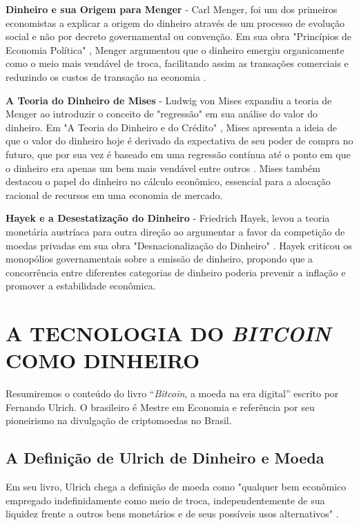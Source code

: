 \documentclass[article,12pt,oneside,a4paper,english,brazil]{unifil}
\begin{document}
\begin{Spacing}{1.5}
\textbf{Dinheiro e sua Origem para Menger} - Carl Menger, foi um dos primeiros economistas a explicar a origem do dinheiro através de um processo de evolução social e não por decreto governamental ou convenção. Em sua obra "Princípios de Economia Política" \cite{menger2017liberalismo}, Menger argumentou que o dinheiro emergiu organicamente como o meio mais vendável de troca, facilitando assim as transações comerciais e reduzindo os custos de transação na economia \cite{menger1871principles}.

\textbf{A Teoria do Dinheiro de Mises} - Ludwig von Mises expandiu a teoria de Menger ao introduzir o conceito de "regressão" em sua análise do valor do dinheiro. Em "A Teoria do Dinheiro e do Crédito" \cite{von2013theory}, Mises apresenta a ideia de que o valor do dinheiro hoje é derivado da expectativa de seu poder de compra no futuro, que por sua vez é baseado em uma regressão contínua até o ponto em que o dinheiro era apenas um bem mais vendável entre outros \cite{von2013theory}. Mises também destacou o papel do dinheiro no cálculo econômico, essencial para a alocação racional de recursos em uma economia de mercado.

\textbf{Hayek e a Desestatização do Dinheiro} - Friedrich Hayek, levou a teoria monetária austríaca para outra direção ao argumentar a favor da competição de moedas privadas em sua obra "Desnacionalização do Dinheiro" \cite{hayek2017desestatizaccao}. Hayek criticou os monopólios governamentais sobre a emissão de dinheiro, propondo que a concorrência entre diferentes categorias de dinheiro poderia prevenir a inflação e promover a estabilidade econômica.

\section*{A TECNOLOGIA DO \textit{BITCOIN} COMO DINHEIRO} \label{sec:dinheiro}
Resumiremos o conteúdo do livro ``\textit{Bitcoin}, a moeda na era digital'' escrito por Fernando Ulrich. O brasileiro é Mestre em Economia e referência por seu pioneirismo na divulgação de criptomoedas no Brasil.

\subsection*{A Definição de Ulrich de Dinheiro e Moeda}

Em seu livro, Ulrich chega a definição de moeda como "qualquer bem econômico empregado indefinidamente como meio de troca, independentemente de sua liquidez frente a outros bens monetários e de seus possíveis usos alternativos" \cite[P.89]{Ulrich2014}.


\end{Spacing}
\end{document}
